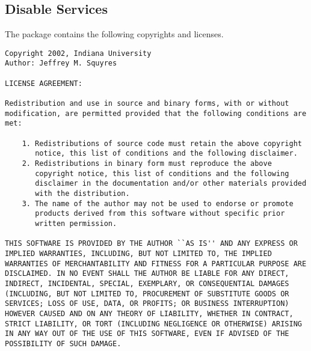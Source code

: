%
%
%

\subsection{Disable Services}

The  package contains the following copyrights
and licenses.

\begin{verbatim}
Copyright 2002, Indiana University
Author: Jeffrey M. Squyres

LICENSE AGREEMENT:

Redistribution and use in source and binary forms, with or without
modification, are permitted provided that the following conditions are
met:

    1. Redistributions of source code must retain the above copyright
       notice, this list of conditions and the following disclaimer.
    2. Redistributions in binary form must reproduce the above
       copyright notice, this list of conditions and the following
       disclaimer in the documentation and/or other materials provided
       with the distribution.
    3. The name of the author may not be used to endorse or promote
       products derived from this software without specific prior
       written permission.

THIS SOFTWARE IS PROVIDED BY THE AUTHOR ``AS IS'' AND ANY EXPRESS OR
IMPLIED WARRANTIES, INCLUDING, BUT NOT LIMITED TO, THE IMPLIED
WARRANTIES OF MERCHANTABILITY AND FITNESS FOR A PARTICULAR PURPOSE ARE
DISCLAIMED. IN NO EVENT SHALL THE AUTHOR BE LIABLE FOR ANY DIRECT,
INDIRECT, INCIDENTAL, SPECIAL, EXEMPLARY, OR CONSEQUENTIAL DAMAGES
(INCLUDING, BUT NOT LIMITED TO, PROCUREMENT OF SUBSTITUTE GOODS OR
SERVICES; LOSS OF USE, DATA, OR PROFITS; OR BUSINESS INTERRUPTION)
HOWEVER CAUSED AND ON ANY THEORY OF LIABILITY, WHETHER IN CONTRACT,
STRICT LIABILITY, OR TORT (INCLUDING NEGLIGENCE OR OTHERWISE) ARISING
IN ANY WAY OUT OF THE USE OF THIS SOFTWARE, EVEN IF ADVISED OF THE
POSSIBILITY OF SUCH DAMAGE.
\end{verbatim}

